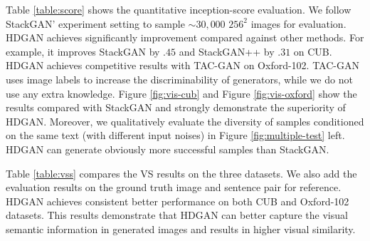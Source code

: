 \documentclass[10pt,twocolumn,letterpaper]{article}
\begin{document}
Table \ref{table:score} shows the quantitative inception-score evaluation. We follow StackGAN' experiment setting to sample ${\sim}30,000$ $256^2$ images for evaluation.
HDGAN achieves significantly improvement compared against other methods. For example, it improves StackGAN by $.45$ and StackGAN++ by $.31$ on CUB.
HDGAN achieves competitive results with TAC-GAN on Oxford-102. TAC-GAN uses image labels to increase the discriminability of generators, while we do not use any extra knowledge. Figure \ref{fig:vis-cub} and Figure \ref{fig:vis-oxford} show the results compared with StackGAN and strongly demonstrate the superiority of HDGAN. Moreover, we qualitatively evaluate the diversity of samples conditioned on the same text (with different input noises) in Figure \ref{fig:multiple-test} left. HDGAN can generate obviously more successful samples than StackGAN.

Table \ref{table:vss} compares the VS results on the three datasets. We also add the evaluation results on the ground truth image and sentence pair for reference.  HDGAN achieves consistent better performance on both CUB and Oxford-102 datasets. This results demonstrate that HDGAN can better capture the visual semantic information in generated images and results in higher visual similarity. 


\end{document}
